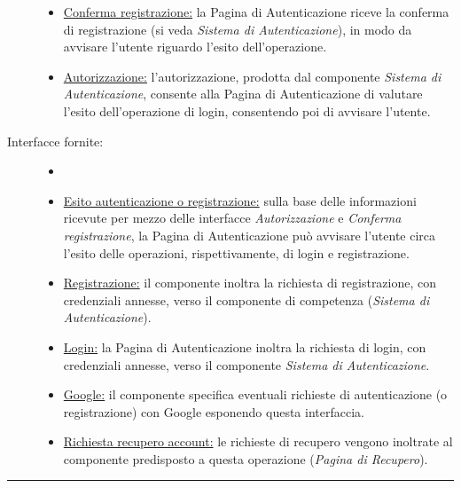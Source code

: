 \documentclass[11pt, a4paper]{article}
\theoremstyle{definition} %
\begin{document}
\begin{description}
\begin{itemize}
        \item \underline{Conferma registrazione:} la Pagina di Autenticazione
        riceve la conferma di registrazione (si veda \textit{Sistema di
        Autenticazione}), in modo da avvisare l'utente riguardo l'esito
        dell'operazione.

        \item \underline{Autorizzazione:} l'autorizzazione, prodotta dal
        componente \textit{Sistema di Autenticazione}, consente alla
        Pagina di Autenticazione di valutare l'esito dell'operazione di
        login, consentendo poi di avvisare l'utente.
    \end{itemize}

    \item[Interfacce fornite:]
    \begin{itemize}
        \item[]

        \item \underline{Esito autenticazione o registrazione:} sulla
        base delle informazioni ricevute per mezzo delle interfacce
        \textit{Autorizzazione} e \textit{Conferma registrazione},
        la Pagina di Autenticazione può avvisare l'utente circa
        l'esito delle operazioni, rispettivamente, di login e
        registrazione.

        \item \underline{Registrazione:} il componente inoltra la
        richiesta di registrazione, con credenziali annesse, verso
        il componente di competenza (\textit{Sistema di Autenticazione}).

        \item \underline{Login:} la Pagina di Autenticazione inoltra
        la richiesta di login, con credenziali annesse, verso il
        componente \textit{Sistema di Autenticazione}.

        \item \underline{Google:} il componente specifica eventuali
        richieste di autenticazione (o registrazione) con Google
        esponendo questa interfaccia.

        \item \underline{Richiesta recupero account:} le richieste di
        recupero vengono inoltrate al componente predisposto a questa
        operazione (\textit{Pagina di Recupero}).
    \end{itemize}
\end{description}


\begin{center}
    \rule{5cm}{1pt}
\end{center}
\end{document}
